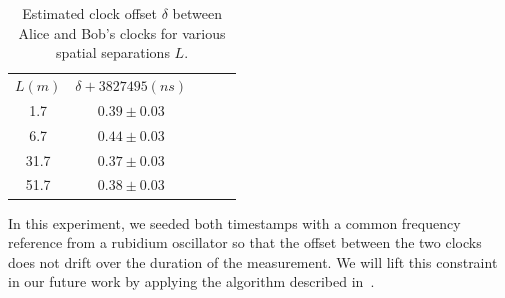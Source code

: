 \documentclass[aps,pra,onecolumn, superscriptaddress]{revtex4}
\begin{document}
\begin{table}[htbp] 
\centering
\label{table:offsets}
\begin{tabular}{cclll}
$L(m)$ & $\delta + 3827495(ns)$\\
 1.7 & $0.39\pm0.03$\\
 6.7 & $0.44\pm0.03$ \\
 31.7 & $0.37\pm0.03$\\
 51.7 & $0.38\pm0.03$
\end{tabular}
\caption{Estimated clock offset $\delta$ between Alice and Bob's clocks for various spatial separations $L$.}
\end{table}

In this experiment, we seeded both timestamps with a common frequency reference from a rubidium oscillator so that the offset between the two clocks does not drift over the duration of the measurement.
We will lift this constraint in our future work by applying the algorithm described in~\cite{Ho2009}.
     
\end{document}

